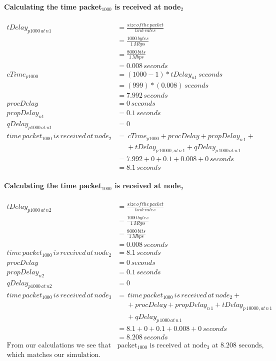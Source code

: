 \documentclass[fleqn,11pt]{article}
\begin{document}
\paragraph{Calculating the time packet$_{1000}$ is received at node$_2$ }
\begin{align*}
tDelay_{p1000\,at\,n1} &=  \frac{size\,of\,the\,packet} {link\,rates}\\
&= \frac{1000\,bytes} {1\,Mbps}\\
&=  \frac{8000\,bits} {1\,Mbps}\\
&= 0.008 \,seconds\\
cTime_{p1000} &= (1000-1) *tDelay_{n1}\,seconds\\
&= (999) *(0.008)\,seconds\\
&= 7.992\,seconds\\
procDelay &= 0\,seconds\\
propDelay_{n1} &= 0.1\,seconds\\
qDelay_{p1000\,at\,n1} &= 0\\
time\,packet_{1000}\,is\,received\,at\,node_{2} &= \,cTime_{p1000} + procDelay + propDelay_{n\,1} +\\
&\,\,\,\,\,\,\,\, + tDelay_{p\,10000,at\,n\,1} + qDelay_{p\,1000\,at\,n\,1}\\
&= 7.992 + 0 + 0.1 + 0.008 + 0\,seconds\\
&= 8.1\,seconds
\end{align*}

\paragraph{Calculating the time packet$_{1000}$ is received at node$_2$ }
\begin{align*}
tDelay_{p1000\,at\,n2} &=  \frac{size\,of\,the\,packet} {link\,rates}\\
&= \frac{1000\,bytes} {1\,Mbps}\\
&=  \frac{8000\,bits} {1\,Mbps}\\
&= 0.008 \,seconds\\
time\,packet_{1000}\,is\,received\,at\,node_{2} &= 8.1\,seconds\\
procDelay &= 0\,seconds\\
propDelay_{n2} &= 0.1\,seconds\\
qDelay_{p1000\,at\,n2} &= 0\\
time\,packet_{1000}\,is\,received\,at\,node_{3} &= \,time\,packet_{1000}\,is\,received\,at\,node_{2} + \\
&\,\,\,\,\,\,\,\, + procDelay + propDelay_{n\,1} + tDelay_{p\,10000,at\,n\,1} \\
&\,\,\,\,\,\,\,\, + qDelay_{p\,1000\,at\,n\,1}\\
&= 8.1 + 0 + 0.1 + 0.008 + 0\,seconds\\
&= 8.208\,seconds \\
\text{From our calculations we see that }
&\text{packet$_{1000}$ is received at node$_3$ at 8.208 seconds,} \\
\text{which matches our simulation.}
\end{align*}
\end{document}
